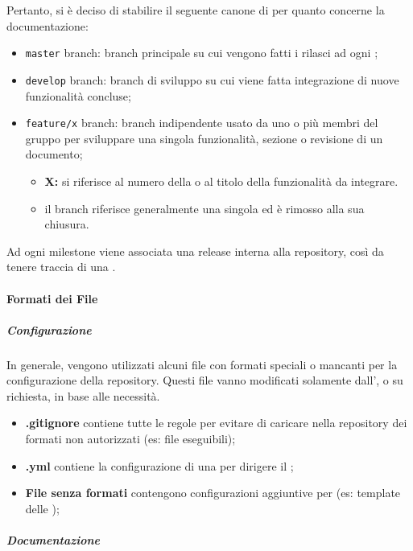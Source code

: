 		Pertanto, si è deciso di stabilire il seguente canone di  per quanto concerne la documentazione:
		\begin{itemize}
			\item \verb!master! branch: branch principale su cui vengono fatti i rilasci ad ogni ;
			\item \verb!develop! branch: branch di sviluppo su cui viene fatta integrazione di nuove funzionalità concluse;
			\item \verb!feature/x! branch: branch indipendente usato da uno o più membri del gruppo per sviluppare una singola funzionalità, sezione o revisione di un documento;
			\begin{itemize}
				\item \textbf{X:} si riferisce al numero della  o al titolo della funzionalità da integrare.
				\item il branch riferisce generalmente una singola  ed è rimosso alla sua chiusura.
			\end{itemize}
		\end{itemize}

		Ad ogni milestone viene associata una release interna alla repository, così da tenere traccia di una .

		\paragraph{Formati dei File}

			\subparagraph{Configurazione}

			In generale, vengono utilizzati alcuni file con formati speciali o mancanti per la configurazione della repository. Questi file vanno modificati solamente dall', o su richiesta, in base alle necessità.
			\begin{itemize}
				\item \textbf{.gitignore} contiene tutte le regole per evitare di caricare nella repository dei formati non autorizzati (es: file eseguibili);
				\item \textbf{.yml} contiene la configurazione di una  per dirigere il ;
				\item \textbf{File senza formati} contengono configurazioni aggiuntive per  (es: template delle );
			\end{itemize}

			\subparagraph{Documentazione}

